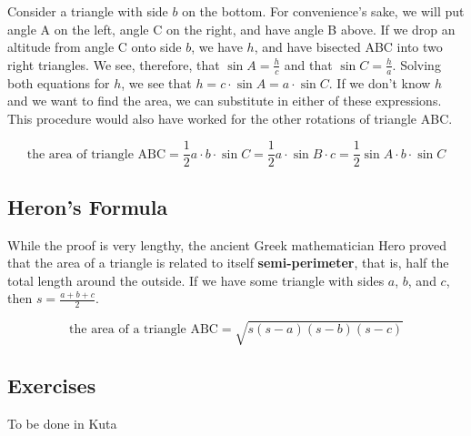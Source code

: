 Consider a triangle with side $b$ on the bottom.  For convenience's sake, we will put angle
A on the left, angle C on the right, and have angle B above.  If we drop an altitude from angle
C onto side $b$, we have $h$, and have bisected ABC into two right triangles.  We see,
therefore, that $\sin A = \frac{h}{c}$ and that $\sin C = \frac{h}{a}$.  Solving both equations
for $h$, we see that $h = c \cdot \sin A = a \cdot \sin C$.  If we don't know $h$ and we want to
find the area, we can substitute in either of these expressions.  This procedure would also have
worked for the other rotations of triangle ABC.

\begin{equation}
\text{the area of triangle ABC} = \frac{1}{2} a \cdot b \cdot \sin C = \frac{1}{2} a \cdot \sin B \cdot c = \frac{1}{2} \sin A \cdot b \cdot \sin C
\end{equation}

\subsection{Heron's Formula}
While the proof is very lengthy, the ancient Greek mathematician Hero proved that the area of a 
triangle is related to itself \textbf{semi-perimeter}, that is, half the total length around the outside.
If we have some triangle with sides $a$, $b$, and $c$, then $s = \frac{a + b + c}{2}$.  

\begin{equation}
\text{the area of a triangle ABC} = \sqrt{s(s-a)(s-b)(s-c)}
\end{equation}

\newpage
\subsection{Exercises}
To be done in Kuta


{}
